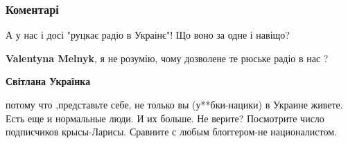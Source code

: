  
 
 
 
 
\subsubsection{Коментарі}

\begin{itemize}
 
А у нас і досі "руцкає радіо в Украінє"! Що воно за одне і навіщо?

\begin{itemize}
 
\textbf{Valentyna Melnyk}, я не розумію, чому дозволене те рюське радіо в нас ?

\begin{itemize}
 
\textbf{Світлана Українка} 

потому что ,представьте себе, не только вы (у**бки-нацики) в Украине живете.
Есть еще и нормальные люди. И их больше. Не верите? Посмотрите число
подписчиков крысы-Ларисы. Сравните с любым блоггером-не националистом.

\end{itemize}

\end{itemize}

 

\end{itemize}
